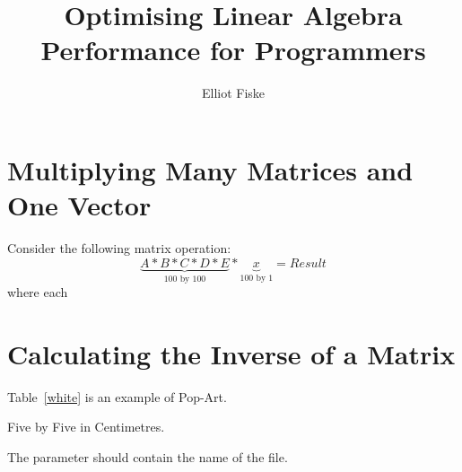 \documentclass[report,12pt,notitlepage,onecolumn]{article}
\author{Elliot Fiske}
\title{Optimising Linear Algebra Performance for Programmers}
\begin{document}
\maketitle
\tableofcontents

\listoftables

\section{Multiplying Many Matrices and One Vector}
Consider the following matrix operation:
\begin{equation}
\underbrace{A * B * C * D * E}
_\text{100 by 100}{} *\underbrace{x}
_\text{100 by 1} = Result
\end{equation}
where each 


\section{Calculating the Inverse of a Matrix}

Table~\ref{white} is an example of Pop-Art.
\begin{table}[!hbtp]
\makebox[\textwidth]{\framebox[5cm]{\rule{0pt}{5cm}}}
\caption[summary]{Five by Five in Centimetres.\label{white}}
\end{table}

The parameter
 should
contain the name of the file.
\end{document}
